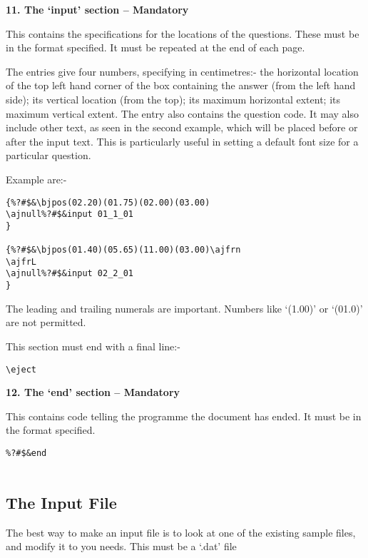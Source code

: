 \vspace*{0.2cm}
{\bf \large 11. The `input' section -- Mandatory}
\vspace*{0.2cm}

This contains the specifications for the locations of the questions. These
must be in the format specified. It must be repeated at the end of each
page.

The entries give four numbers, specifying in centimetres:- the horizontal
location of the top left hand corner of the box containing the answer (from
the left hand side); its vertical location (from the top); its maximum
horizontal extent; its maximum vertical extent.  The entry also contains
the question code. It may also include other text, as seen in the second
example, which will be placed before or after the input text. This is
particularly useful in setting a default font size for a particular
question.

Example are:-

\begin{verbatim}
{%?#$&\bjpos(02.20)(01.75)(02.00)(03.00)
\ajnull%?#$&input 01_1_01
}

{%?#$&\bjpos(01.40)(05.65)(11.00)(03.00)\ajfrn
\ajfrL
\ajnull%?#$&input 02_2_01
}
\end{verbatim}

The leading and trailing numerals are important. Numbers like `(1.00)'
or `(01.0)' are not permitted.

This section must end with a final line:-

\begin{verbatim}
\eject
\end{verbatim}

\vspace*{0.2cm}
{\bf \large 12. The `end' section -- Mandatory}
\vspace*{0.2cm}

This contains code telling the programme the document has ended. It must be
in the format specified.

\begin{verbatim}
%?#$&end


\end{verbatim}

\subsection{The Input File}

The best way to make an input file is to look at one of the existing sample
files, and modify it to you needs. This must be a `.dat' file

